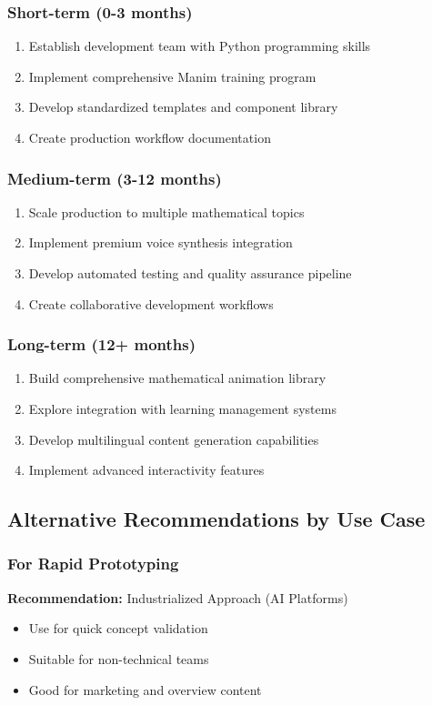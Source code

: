 \documentclass[12pt,a4paper]{article}
\begin{document}
\subsubsection{Short-term (0-3 months)}
\begin{enumerate}
    \item Establish development team with Python programming skills
    \item Implement comprehensive Manim training program
    \item Develop standardized templates and component library
    \item Create production workflow documentation
\end{enumerate}

\subsubsection{Medium-term (3-12 months)}
\begin{enumerate}
    \item Scale production to multiple mathematical topics
    \item Implement premium voice synthesis integration
    \item Develop automated testing and quality assurance pipeline
    \item Create collaborative development workflows
\end{enumerate}

\subsubsection{Long-term (12+ months)}
\begin{enumerate}
    \item Build comprehensive mathematical animation library
    \item Explore integration with learning management systems
    \item Develop multilingual content generation capabilities
    \item Implement advanced interactivity features
\end{enumerate}

\subsection{Alternative Recommendations by Use Case}

\subsubsection{For Rapid Prototyping}
\textbf{Recommendation:} Industrialized Approach (AI Platforms)
\begin{itemize}
    \item Use for quick concept validation
    \item Suitable for non-technical teams
    \item Good for marketing and overview content
\end{itemize}
\end{document}

